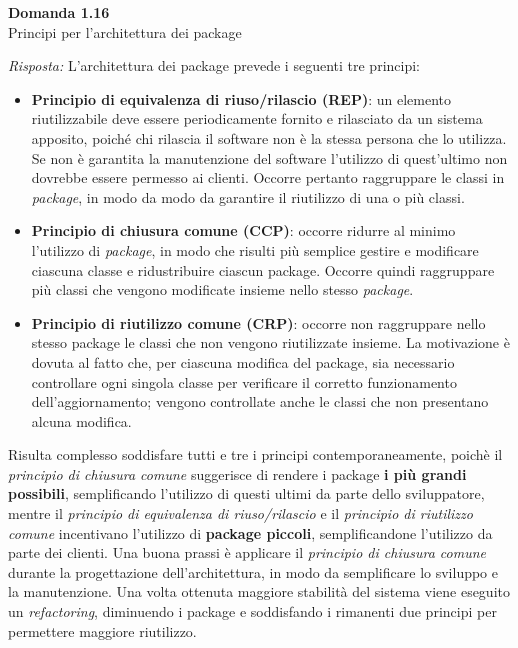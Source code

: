 \documentclass{article}
\newenvironment{problem}[2][Domanda]
    { \begin{mdframed}[backgroundcolor=gray!20] \textbf{#1 #2} \\}
    {  \end{mdframed}}
\newenvironment{solution}
    {\textit{Risposta:}}
    {}
\begin{document}
\begin{problem}{1.16}
Principi per l'architettura dei package
\end{problem}
\begin{solution}
L'architettura dei package prevede i seguenti tre principi:
\begin{itemize}
	\item \textbf{Principio di equivalenza di riuso/rilascio (REP)}: un elemento riutilizzabile deve essere periodicamente fornito e rilasciato da un sistema apposito, poiché chi rilascia il software non è la stessa persona che lo utilizza.
	\newline
	Se non è garantita la manutenzione del software l'utilizzo di quest'ultimo non dovrebbe essere permesso ai clienti. Occorre pertanto raggruppare le classi in \textit{package}, in modo da modo da garantire il riutilizzo di una o più classi.
	\item \textbf{Principio di chiusura comune (CCP)}: occorre ridurre al minimo l'utilizzo di \textit{package}, in modo che risulti più semplice gestire e modificare ciascuna classe e ridustribuire ciascun package.
	\newline
	Occorre quindi raggruppare più classi che vengono modificate insieme nello stesso \textit{package}.
	\item \textbf{Principio di riutilizzo comune (CRP)}: occorre non raggruppare nello stesso package le classi che non vengono riutilizzate insieme.
	\newline La motivazione è dovuta al fatto che, per ciascuna modifica del package, sia necessario controllare ogni singola classe per verificare il corretto funzionamento dell'aggiornamento; vengono controllate anche le classi che non presentano alcuna modifica.
\end{itemize}
Risulta complesso soddisfare tutti e tre i principi contemporaneamente, poichè il \textit{principio di chiusura comune} suggerisce di rendere i package \textbf{i più grandi possibili}, semplificando l'utilizzo di questi ultimi da parte dello sviluppatore, mentre il \textit{principio di equivalenza di riuso/rilascio} e il \textit{principio di riutilizzo comune} incentivano l'utilizzo di \textbf{package piccoli}, semplificandone l'utilizzo da parte dei clienti.
Una buona prassi è applicare il \textit{principio di chiusura comune} durante la progettazione dell'architettura, in modo da semplificare lo sviluppo e la manutenzione. Una volta ottenuta maggiore stabilità del sistema viene eseguito un \textit{refactoring}, diminuendo i package e soddisfando i rimanenti due principi per permettere maggiore riutilizzo.

\end{solution}
\end{document}

